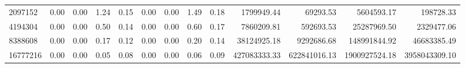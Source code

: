 \begin{tabular}{lrrrrrrrrrrrr}
2097152  &        0.00 &        0.00 &          1.24 &          0.15 &           0.00 &           0.00 &         1.49 &         0.18 &       1799949.44 &         69293.53 &      5604593.17 &       198728.33 \\
4194304  &        0.00 &        0.00 &          0.50 &          0.14 &           0.00 &           0.00 &         0.60 &         0.17 &       7860209.81 &        592693.53 &     25287969.50 &      2329477.06 \\
8388608  &        0.00 &        0.00 &          0.17 &          0.12 &           0.00 &           0.00 &         0.20 &         0.14 &      38124925.18 &       9292686.68 &    148991844.92 &     46683385.49 \\
16777216 &        0.00 &        0.00 &          0.05 &          0.08 &           0.00 &           0.00 &         0.06 &         0.09 &     427083333.33 &     622841016.13 &   1900927524.18 &   3958043309.10 \\
\bottomrule
\end{tabular}
